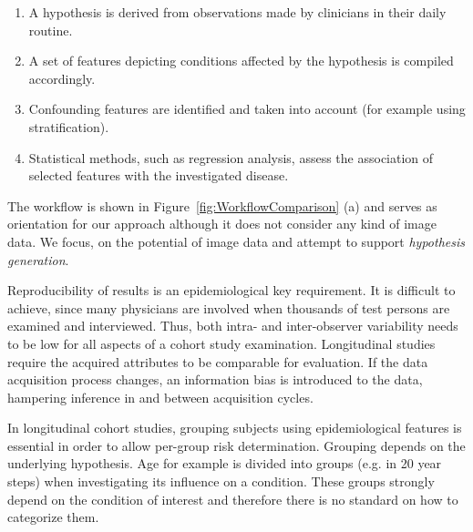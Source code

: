 \documentclass[journal]{style/vgtc} 			          %
\begin{document}
\begin{enumerate}
	\item A hypothesis is derived from observations made by clinicians in their daily routine.
%
	\item A set of features depicting conditions affected by the hypothesis is compiled accordingly.
	\item Confounding features are identified and taken into account (for example using stratification). %
%
	\item Statistical methods, such as regression analysis, assess the association of selected features with the investigated disease.%
\end{enumerate}
The workflow is shown in Figure~\ref{fig:WorkflowComparison} (a) and serves as orientation for our approach although it does not consider any kind of image data.
%
We focus, on the potential of image data and attempt to support \emph{hypothesis generation}.

Reproducibility of results is an epidemiological key requirement.
%
It is difficult to achieve, since many physicians are involved when thousands of test persons are examined and interviewed.
%
Thus, both intra- and inter-observer variability needs to be low for all aspects of a cohort study examination.
%
Longitudinal studies require the acquired attributes to be comparable for evaluation.
%
If the data acquisition process changes, an information bias is introduced to the data, hampering inference in and between acquisition cycles.
%

In longitudinal cohort studies, grouping subjects using epidemiological features is essential in order to allow per-group risk determination.
%
Grouping depends on the underlying hypothesis.
%
Age for example is divided into groups (e.g. in 20 year steps) when investigating its influence on a condition.
%
These groups strongly depend on the condition of interest and therefore there is no standard on how to categorize them.
\end{document}
